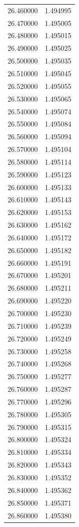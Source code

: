 \begin{tabular}{rr}
26.460000 & 1.494995 \\
26.470000 & 1.495005 \\
26.480000 & 1.495015 \\
26.490000 & 1.495025 \\
26.500000 & 1.495035 \\
26.510000 & 1.495045 \\
26.520000 & 1.495055 \\
26.530000 & 1.495065 \\
26.540000 & 1.495074 \\
26.550000 & 1.495084 \\
26.560000 & 1.495094 \\
26.570000 & 1.495104 \\
26.580000 & 1.495114 \\
26.590000 & 1.495123 \\
26.600000 & 1.495133 \\
26.610000 & 1.495143 \\
26.620000 & 1.495153 \\
26.630000 & 1.495162 \\
26.640000 & 1.495172 \\
26.650000 & 1.495182 \\
26.660000 & 1.495191 \\
26.670000 & 1.495201 \\
26.680000 & 1.495211 \\
26.690000 & 1.495220 \\
26.700000 & 1.495230 \\
26.710000 & 1.495239 \\
26.720000 & 1.495249 \\
26.730000 & 1.495258 \\
26.740000 & 1.495268 \\
26.750000 & 1.495277 \\
26.760000 & 1.495287 \\
26.770000 & 1.495296 \\
26.780000 & 1.495305 \\
26.790000 & 1.495315 \\
26.800000 & 1.495324 \\
26.810000 & 1.495334 \\
26.820000 & 1.495343 \\
26.830000 & 1.495352 \\
26.840000 & 1.495362 \\
26.850000 & 1.495371 \\
26.860000 & 1.495380 \\

\end{tabular}
